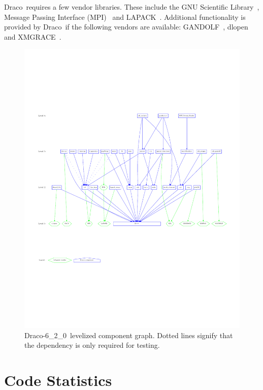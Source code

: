 \documentclass[note]{ResearchNote_pdf}
\newcommand{\draco}{Draco}
\newcommand{\dracor}{\draco-6\_2\_0}
\begin{document}
\draco\ requires a few vendor libraries.  These include the
\textsf{GNU Scientific Library}~\cite{gslref}, \textsf{Message Passing
  Interface (MPI)}~\cite{openmpiweb} and
\textsf{LAPACK}~\cite{lapackweb}.  Additional functionality is
provided by \draco\ if the following vendors are available:
\textsf{GANDOLF}~\cite{gandolf}, \textsf{dlopen} and
\textsf{XMGRACE}~\cite{xmgraceweb}.

\begin{figure}
  \label{fig:level}
  \centerline{
    \includegraphics[width=8.5in,angle=90]{level-6_2_0.pdf}}
  \caption{\dracor\ levelized component graph.  Dotted lines signify
    that the dependency is only required for testing.}
\end{figure}


\section{Code Statistics}
\end{document}
